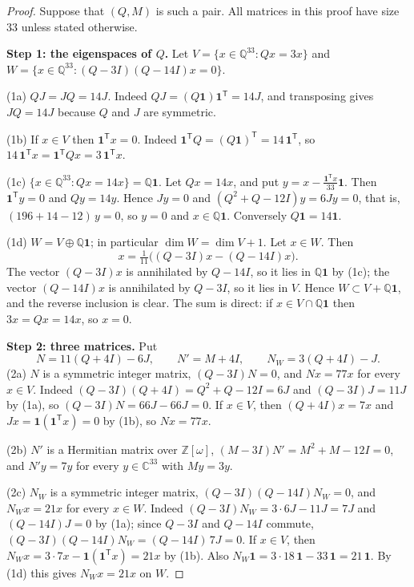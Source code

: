 \documentclass[11pt,a4paper]{article}
\theoremstyle{remark}
\newcommand{\ZZ}{\mathbb{Z}}
\newcommand{\QQ}{\mathbb{Q}}
\newcommand{\CC}{\mathbb{C}}
\newcommand{\one}{\mathbf{1}}
\newcommand{\tp}{\mathsf{T}}
\begin{document}
\begin{proof}
Suppose that $(Q,M)$ is such a pair. All matrices in this proof have size $33$ unless stated otherwise.

\medskip\noindent\textbf{Step 1: the eigenspaces of $Q$.}
Let $V=\{x\in\QQ^{33} : Qx=3x\}$ and $W=\{x\in\QQ^{33} : (Q-3I)(Q-14I)x=0\}$.

\smallskip\noindent(1a) $QJ=JQ=14J$. Indeed $QJ=(Q\one)\one^{\tp}=14J$, and transposing gives $JQ=14J$ because $Q$
and $J$ are symmetric.

\smallskip\noindent(1b) If $x\in V$ then $\one^{\tp}x=0$. Indeed $\one^{\tp}Q=(Q\one)^{\tp}=14\,\one^{\tp}$, so
$14\,\one^{\tp}x=\one^{\tp}Qx=3\,\one^{\tp}x$.

\smallskip\noindent(1c) $\{x\in\QQ^{33} : Qx=14x\}=\QQ\one$. Let $Qx=14x$, and put $y=x-\frac{\one^{\tp}x}{33}\one$.
Then $\one^{\tp}y=0$ and $Qy=14y$. Hence $Jy=0$ and $(Q^2+Q-12I)y=6Jy=0$, that is, $(196+14-12)\,y=0$, so $y=0$ and
$x\in\QQ\one$. Conversely $Q\one=14\one$.

\smallskip\noindent(1d) $W=V\oplus\QQ\one$; in particular $\dim W=\dim V+1$. Let $x\in W$. Then
\[
x=\tfrac1{11}\bigl((Q-3I)x-(Q-14I)x\bigr).
\]
The vector $(Q-3I)x$ is annihilated by $Q-14I$, so it lies in $\QQ\one$ by (1c); the vector $(Q-14I)x$ is
annihilated by $Q-3I$, so it lies in $V$. Hence $W\subset V+\QQ\one$, and the reverse inclusion is clear. The sum is
direct: if $x\in V\cap\QQ\one$ then $3x=Qx=14x$, so $x=0$.

\medskip\noindent\textbf{Step 2: three matrices.}
Put
\[
N=11(Q+4I)-6J,\qquad N'=M+4I,\qquad N_W=3(Q+4I)-J .
\]
\noindent(2a) $N$ is a symmetric integer matrix, $(Q-3I)N=0$, and $Nx=77x$ for every $x\in V$. Indeed
$(Q-3I)(Q+4I)=Q^2+Q-12I=6J$ and $(Q-3I)J=11J$ by (1a), so $(Q-3I)N=66J-66J=0$. If $x\in V$, then $(Q+4I)x=7x$ and
$Jx=\one(\one^{\tp}x)=0$ by (1b), so $Nx=77x$.

\smallskip\noindent(2b) $N'$ is a Hermitian matrix over $\ZZ[\omega]$, $(M-3I)N'=M^2+M-12I=0$, and $N'y=7y$ for
every $y\in\CC^{33}$ with $My=3y$.

\smallskip\noindent(2c) $N_W$ is a symmetric integer matrix, $(Q-3I)(Q-14I)N_W=0$, and $N_Wx=21x$ for every
$x\in W$. Indeed $(Q-3I)N_W=3\cdot6J-11J=7J$ and $(Q-14I)J=0$ by (1a); since $Q-3I$ and $Q-14I$ commute,
$(Q-3I)(Q-14I)N_W=(Q-14I)\,7J=0$. If $x\in V$, then $N_Wx=3\cdot7x-\one(\one^{\tp}x)=21x$ by (1b). Also
$N_W\one=3\cdot18\,\one-33\,\one=21\,\one$. By (1d) this gives $N_Wx=21x$ on $W$.


\end{proof}
\end{document}
